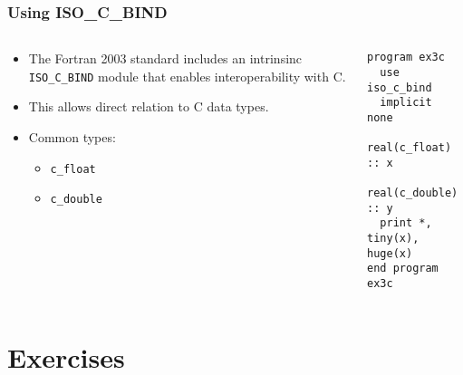 \begin{frame}[fragile]
  \frametitle{Using ISO\_C\_BIND}
  \begin{columns}[T]
    \begin{column}{0.5\textwidth}
      \begin{itemize}
        \item The Fortran 2003 standard includes an intrinsinc \texttt{ISO\_C\_BIND} module that enables interoperability with C.
        \item This allows direct relation to C data types.
        \item Common types:
          \begin{itemize}
            \item \texttt{c\_float}
            \item \texttt{c\_double}
          \end{itemize}
      \end{itemize}
    \end{column}

    \begin{column}{0.5\textwidth}
      \begin{lstlisting}
program ex3c
  use iso_c_bind
  implicit none
  real(c_float) :: x
  real(c_double) :: y
  print *, tiny(x), huge(x)
end program ex3c
      \end{lstlisting}
    \end{column}
  \end{columns}
\end{frame}

\section{Exercises}

